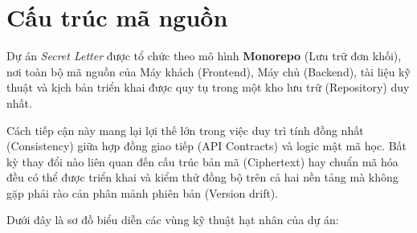 \section{Cấu trúc mã nguồn}

Dự án \textit{Secret Letter} được tổ chức theo mô hình \textbf{Monorepo} (Lưu trữ đơn khối), nơi toàn bộ mã nguồn của Máy khách (Frontend), Máy chủ (Backend), tài liệu kỹ thuật và kịch bản triển khai được quy tụ trong một kho lưu trữ (Repository) duy nhất. 

Cách tiếp cận này mang lại lợi thế lớn trong việc duy trì tính đồng nhất (Consistency) giữa hợp đồng giao tiếp (API Contracts) và logic mật mã học. Bất kỳ thay đổi nào liên quan đến cấu trúc bản mã (Ciphertext) hay chuẩn mã hóa đều có thể được triển khai và kiểm thử đồng bộ trên cả hai nền tảng mà không gặp phải rào cản phân mảnh phiên bản (Version drift).

Dưới đây là sơ đồ biểu diễn các vùng kỹ thuật hạt nhân của dự án:

